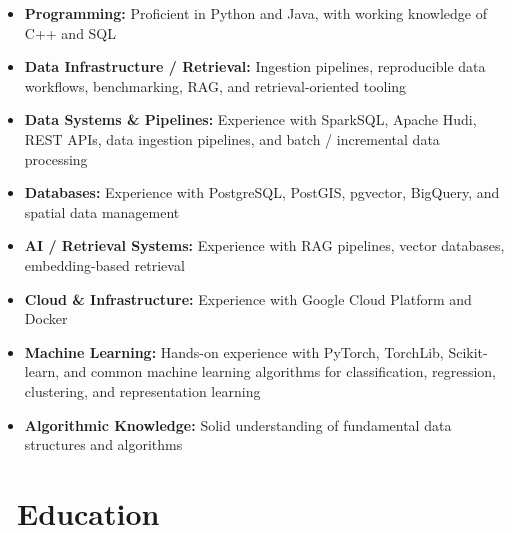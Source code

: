 \documentclass{resume}
\begin{document}
\begin{itemize}[parsep=0.4ex]

\item \textbf{Programming:} Proficient in Python and Java, with working knowledge of C++ and SQL

\item \textbf{Data Infrastructure / Retrieval:} Ingestion pipelines, reproducible data workflows, benchmarking, RAG, and retrieval-oriented tooling

\item \textbf{Data Systems \& Pipelines:} Experience with SparkSQL, Apache Hudi, REST APIs, data ingestion pipelines, and batch / incremental data processing

\item \textbf{Databases:} Experience with PostgreSQL, PostGIS, pgvector, BigQuery, and spatial data management

\item \textbf{AI / Retrieval Systems:} Experience with RAG pipelines, vector databases, embedding-based retrieval

\item \textbf{Cloud \& Infrastructure:} Experience with Google Cloud Platform and Docker

\item \textbf{Machine Learning:} Hands-on experience with PyTorch, TorchLib, Scikit-learn, and common machine learning algorithms for classification, regression, clustering, and representation learning

  \item \textbf{Algorithmic Knowledge:} Solid understanding of fundamental data structures and algorithms
\end{itemize}

\section{\faGraduationCap\ \textbf{Education}}

\end{document}
